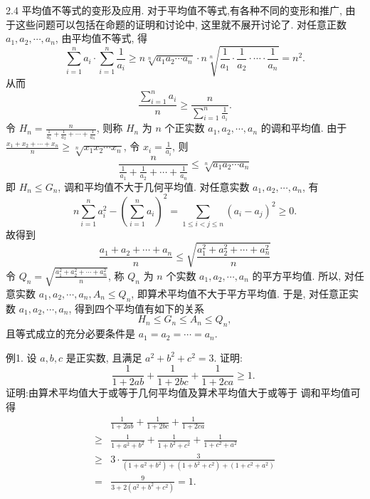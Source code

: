 
2.4 平均值不等式的变形及应用.
对于平均值不等式,有各种不同的变形和推广, 由于这些问题可以包括在命题的证明和讨论中, 这里就不展开讨论了.
对任意正数 $a_1, a_2, \cdots, a_n$, 由平均值不等式, 得
$$
\sum_{i=1}^n a_i \cdot \sum_{i=1}^n \frac{1}{a_i} \geqslant n \sqrt[n]{a_1 a_2 \cdots a_n} \cdot n \sqrt[n]{\frac{1}{a_1} \cdot \frac{1}{a_2} \cdot \cdots \cdot \frac{1}{a_n}}=n^2 .
$$
从而
$$
\frac{\sum_{i=1}^n a_i}{n} \geqslant \frac{n}{\sum_{i=1}^n \frac{1}{a_i}} .
$$
令 $H_n=\frac{n}{\frac{1}{a_1}+\frac{1}{a_2}+\cdots+\frac{1}{a_n}}$, 则称 $H_n$ 为 $n$ 个正实数 $a_1, a_2, \cdots, a_n$ 的调和平均值.
由于 $\frac{x_1+x_2+\cdots+x_n}{n} \geqslant \sqrt[n]{x_1 x_2 \cdots x_n}$, 令 $x_i=\frac{1}{a_i}$, 则
$$
\frac{n}{\frac{1}{a_1}+\frac{1}{a_2}+\cdots+\frac{1}{a_n}} \leqslant \sqrt[n]{a_1 a_2 \cdots a_n}
$$
即 $H_n \leqslant G_n$, 调和平均值不大于几何平均值.
对任意实数 $a_1, a_2, \cdots, a_n$, 有
$$
n \sum_{i=1}^n a_i^2-\left(\sum_{i=1}^n a_i\right)^2=\sum_{1 \leqslant i<j \leqslant n}\left(a_i-a_j\right)^2 \geqslant 0 .
$$
故得到
$$
\frac{a_1+a_2+\cdots+a_n}{n} \leqslant \sqrt{\frac{a_1^2+a_2^2+\cdots+a_n^2}{n}}
$$
令 $Q_n=\sqrt{\frac{a_1^2+a_2^2+\cdots+a_n^2}{n}}$, 称 $Q_n$ 为 $n$ 个实数 $a_1, a_2, \cdots, a_n$ 的平方平均值.
所以, 对任意实数 $a_1, a_2, \cdots, a_n, A_n \leqslant Q_n$, 即算术平均值不大于平方平均值.
于是, 对任意正实数 $a_1, a_2, \cdots, a_n$, 得到四个平均值有如下的关系
$$
H_n \leqslant G_n \leqslant A_n \leqslant Q_n,
$$
且等式成立的充分必要条件是 $a_1=a_2=\cdots=a_n$.



例1. 设 $a, b, c$ 是正实数, 且满足 $a^2+b^2+c^2=3$. 证明:
$$
\frac{1}{1+2 a b}+\frac{1}{1+2 b c}+\frac{1}{1+2 c a} \geqslant 1 \text {. }
$$
证明:由算术平均值大于或等于几何平均值及算术平均值大于或等于 调和平均值可得
$$
\begin{aligned}
& \frac{1}{1+2 a b}+\frac{1}{1+2 b c}+\frac{1}{1+2 c a} \\
\geqslant & \frac{1}{1+a^2+b^2}+\frac{1}{1+b^2+c^2}+\frac{1}{1+c^2+a^2} \\
\geqslant & 3 \cdot \frac{3}{\left(1+a^2+b^2\right)+\left(1+b^2+c^2\right)+\left(1+c^2+a^2\right)} \\
= & \frac{9}{3+2\left(a^2+b^2+c^2\right)}=1 .
\end{aligned}
$$



